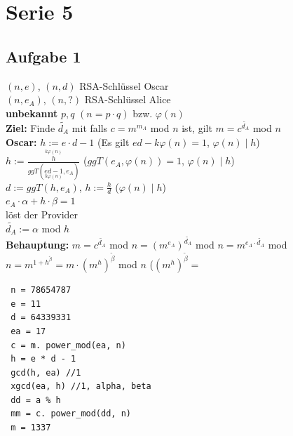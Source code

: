 \documentclass[10pt]{article}
\newcommand{\Bold}[1]{\textbf{#1}} %
\newcommand{\Oben}[2]{\overset{#1}{#2}} %
\newcommand{\Unten}[2]{\underset{#1}{#2}} %
\begin{document}
\section*{Serie 5}
\subsection*{Aufgabe 1}
$(n,e)$, $(n,d)$ RSA-Schlüssel Oscar\\
$(n,e_A)$, $(n,?)$ RSA-Schlüssel Alice\\
\Bold{unbekannt} $p,q$ $(n=p\cdot q)$ bzw. $\varphi(n)$\\
\Bold{Ziel:} Finde $\tilde{d_A}$ mit falls $c=m^{m_A}$ mod $n$ ist, gilt $m=c^{\tilde{d_A}}$ mod $n$\\
\Bold{Oscar:} $h:=e\cdot d-1$ (Es gilt $ed-k\varphi(n)=1$, $\varphi(n)\mid h$)\\
$h:=\frac{\Oben{k\varphi(n)}{h}}{ggT(\Unten{k\varphi(n)}{ed-1},e_A)}$ \hspace*{2cm}($ggT(e_A,\varphi(n))=1$, $\varphi(n)\mid h$)\\
$d:=ggT(h,e_A)$, $h:=\frac{h}{d}$ \hspace*{2cm}($\varphi(n)\mid h$)\\
$e_A\cdot\alpha+h\cdot\beta=1$\\
 löst der Provider\\
$\tilde{d_A}:=\alpha$ mod $h$\\
\Bold{Behauptung:} $m = c^{\tilde{d_A}}$ mod $n=(m^{e_A})^{\tilde{d_A}}$ mod $n=m^{e_A\cdot \tilde{d_A}}$ mod $n=m^{1+h^{\tilde{\beta}}}=m\cdot (m^h)^{\tilde{\beta}}$ mod $n$ ($(m^h)^{\tilde{\beta}} = $
\begin{lstlisting}
 n = 78654787
 e = 11
 d = 64339331
 ea = 17
 c = m. power_mod(ea, n)
 h = e * d - 1
 gcd(h, ea) //1
 xgcd(ea, h) //1, alpha, beta
 dd = a % h
 mm = c. power_mod(dd, n)
 m = 1337
\end{lstlisting}
\end{document}

